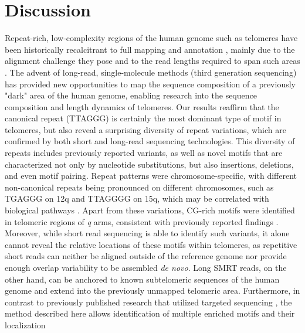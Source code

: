 \documentclass{article}
\begin{document}
\section*{Discussion}  \label{sec:discussion}
    Repeat-rich, low-complexity regions of the human genome such as telomeres
        have been historically recalcitrant to full mapping and annotation \parencite{miga2015},
        mainly due to the alignment challenge they pose and to the read lengths required to span such areas \parencite{ngslowcomplexity}.
    The advent of long-read, single-molecule methods (third generation sequencing)
        has provided new opportunities to map the sequence composition of a previously "dark" area of the human genome,
        enabling research into the sequence composition and length dynamics \parencite{luxton2020} of telomeres.
    Our results reaffirm
        that the canonical repeat (TTAGGG) is certainly the most dominant type of motif in telomeres,
        but also reveal a surprising diversity of repeat variations,
            which are confirmed by both short and long-read sequencing technologies.
    This diversity of repeats includes previously reported variants,
        as well as novel motifs that are characterized not only by nucleotide substitutions,
        but also insertions, deletions, and even motif pairing.
    Repeat patterns were chromosome-specific, with different non-canonical repeats being pronounced on different chromosomes,
        such as TGAGGG on 12q and TTAGGGG on 15q, which may be correlated with biological pathways \parencite{telovars2019}.
    Apart from these variations,
        CG-rich motifs were identified in telomeric regions of \textit{q} arms,
        consistent with previously reported findings \parencite{cpg}.
    Moreover, while short read sequencing is able to identify such variants,
        it alone cannot reveal the relative locations of these motifs within telomeres,
        as repetitive short reads can
            neither be aligned outside of the reference genome
            nor provide enough overlap variability to be assembled \textit{de novo}.
    Long SMRT reads, on the other hand,
        can be anchored to known subtelomeric sequences of the human genome and extend into the previously unmapped telomeric area.
    Furthermore, in contrast to previously published research that utilized targeted sequencing
        \parencite{telovars1989,telovars1999,telovars2018,telovars2019},
        the method described here allows identification of multiple enriched motifs and their localization
\end{document}
